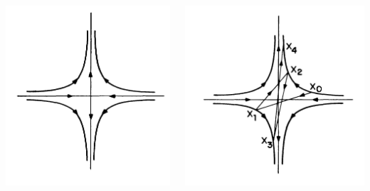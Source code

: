 \documentclass[a4,compress]{beamer}
\theoremstyle{plain}
\theoremstyle{definition}
\begin{document}
\begin{frame}
  \begin{columns}[c]
   \begin{column}{0.5\textwidth}
     \includegraphics[width=\textwidth]{hyperbolic}  
   \end{column}
   \begin{column}{0.5\textwidth}
     \includegraphics[width=\textwidth]{hyperbolic-reflection}
   \end{column}
 \end{columns}
\end{frame}
\end{document}
